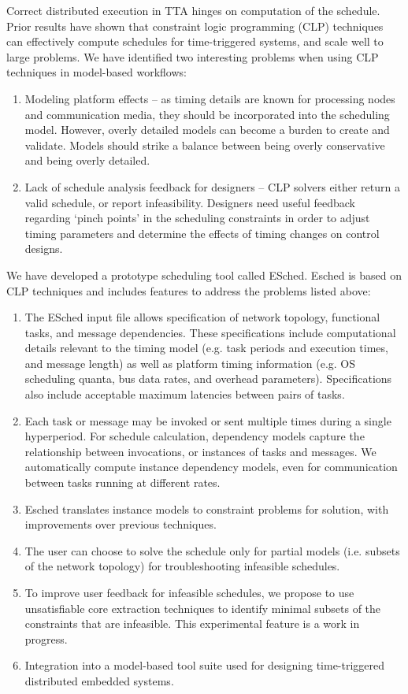 Correct distributed execution in TTA hinges on computation of the schedule.  Prior results have shown that constraint logic programming (CLP) techniques can effectively compute schedules for time-triggered systems\cite{sched:offline}, and scale well to large problems.  We have identified two interesting problems when using CLP techniques in model-based workflows:

\begin{enumerate}
\item Modeling platform effects -- as timing details are known for processing nodes and communication media, they should be incorporated into the scheduling model.  However, overly detailed models can become a burden to create and validate.  Models should strike a balance between being overly conservative and being overly detailed.
\item Lack of schedule analysis feedback for designers -- CLP solvers either return a valid schedule, or report infeasibility.  Designers need useful feedback regarding `pinch points' in the scheduling constraints in order to adjust timing parameters and determine the effects of timing changes on control designs.
\end{enumerate}


We have developed a prototype scheduling tool called ESched.  Esched is based on CLP techniques and includes features to address the problems listed above:

\begin{enumerate}
\item The ESched input file allows specification of network topology, functional tasks, and message dependencies.  These specifications include computational details relevant to the timing model (e.g. task periods and execution times, and message length) as well as platform timing information (e.g. OS scheduling quanta, bus data rates, and overhead parameters).  Specifications also include acceptable maximum latencies between pairs of tasks.
\item Each task or message may be invoked or sent multiple times during a single hyperperiod. For schedule calculation, dependency models capture the relationship between invocations, or instances of tasks and messages.  We automatically compute instance dependency models, even for communication between tasks running at different rates.
\item Esched translates instance models to constraint problems for solution, with improvements over previous techniques.
\item The user can choose to solve the schedule only for partial models (i.e. subsets of the network topology) for troubleshooting infeasible schedules.
\item To improve user feedback for infeasible schedules, we propose to use unsatisfiable core extraction techniques to identify minimal subsets of the constraints that are infeasible.  This experimental feature is a work in progress.
\item Integration into a model-based tool suite used for designing time-triggered distributed embedded systems\cite{modeling:aces08}.
\end{enumerate}

